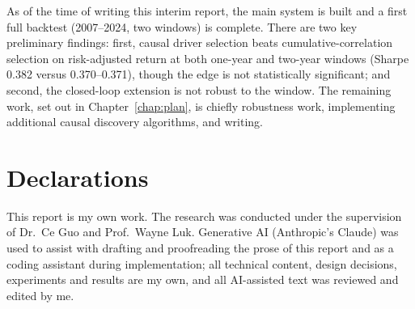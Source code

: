 \documentclass[12pt, a4paper]{report}
\begin{document}
As of the time of writing this interim report, the main system is built and a first full backtest (2007--2024, two windows) is
complete. There are two key preliminary findings: first, causal driver
selection beats cumulative-correlation selection on risk-adjusted return at both one-year and two-year windows
(Sharpe 0.382 versus 0.370--0.371), though the edge is not statistically significant;
and second, the closed-loop extension is not robust to the window. The
remaining work, set out in Chapter~\ref{chap:plan}, is chiefly robustness work, implementing additional causal discovery algorithms, and writing.

\clearpage
\printbibliography[heading=bibintoc, title={References}]

\chapter*{Declarations}
This report is my own work. The
research was conducted under the supervision of Dr.\ Ce Guo and Prof.\ Wayne Luk. Generative AI (Anthropic's Claude) was used to assist with drafting and proofreading the prose of this
report and as a coding assistant during implementation; all technical content, design decisions,
experiments and results are my own, and all AI-assisted text was reviewed and edited by me.
\end{document}
